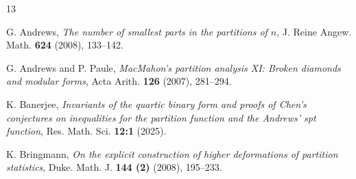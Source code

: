 \documentclass[11pt,reqno,a4paper]{amsart}
\renewcommand{\(}{\left\(}
\renewcommand{\)}{\right\)}
\numberwithin{equation}{section}
\theoremstyle{plain}
\theoremstyle{definition} %
\numberwithin{equation}{section}
\begin{document}
\vspace*{0.5 cm}







	\begin{thebibliography}{13}
		
		
		 G. Andrews, {\it The number of smallest parts in the partitions of $n$}, J. Reine Angew. Math. {\bf 624} (2008), 133--142.
		
		
		 G. Andrews and P. Paule, {\it MacMahon's partition analysis XI: Broken diamonds and modular forms}, Acta Arith. {\bf 126} (2007), 281--294. 
		
		 K. Banerjee, {\it Invariants of the quartic binary form and proofs of Chen’s conjectures on inequalities for the partition function and the Andrews’ spt function}, Res. Math. Sci. {\bf 12:1} (2025).



                 

		
	
		
		

	 K. Bringmann, {\it On the explicit construction of higher deformations of partition statistics}, Duke. Math. J. {\bf 144 (2)} (2008), 195--233.
		

\end{thebibliography}
\end{document}
